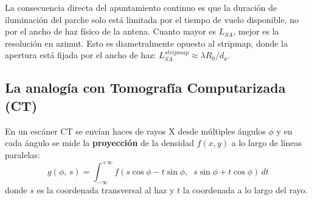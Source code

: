 \documentclass[12pt,a4paper,oneside]{book}
\begin{document}
La consecuencia directa del apuntamiento continuo es que la duración de iluminación del parche solo está limitada por el tiempo de vuelo disponible, no por el ancho de haz físico de la antena. Cuanto mayor es $L_{SA}$, mejor es la resolución en azimut. Esto es diametralmente opuesto al stripmap, donde la apertura está fijada por el ancho de haz: $L_{SA}^{stripmap} \approx \lambda R_0 / d_a$.

\subsection{La analogía con Tomografía Computarizada (CT)}

En un escáner CT se envían haces de rayos X desde múltiples ángulos $\phi$ y en cada ángulo se mide la \textbf{proyección} de la densidad $f(x,y)$ a lo largo de líneas paralelas:
\[
g(\phi,\,s) = \int_{-\infty}^{+\infty} f\!\left(s\cos\phi - t\sin\phi,\;\; s\sin\phi + t\cos\phi\right)\,dt
\]
donde $s$ es la coordenada transversal al haz y $t$ la coordenada a lo largo del rayo.
\end{document}
